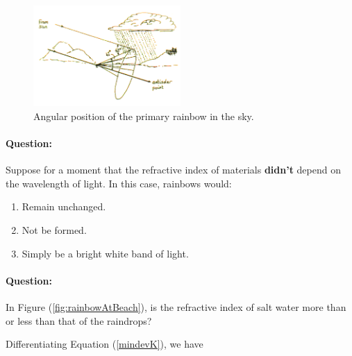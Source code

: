 \begin{refsection}

\begin{figure}[!htb]
    \centering
    \includegraphics[width=0.5\textwidth]{figs/rainarc.png}
    \caption{Angular position of the primary rainbow in the sky.}
    \label{fig:rainbowSky}
\end{figure}


\begin{question}
\paragraph{Question:} Suppose for a moment that the refractive index of materials \textbf{didn't} depend on the wavelength of light. In this case, rainbows would:
\begin{enumerate}
\itemsep0em
    \item Remain unchanged.
    \item Not be formed.
    \item Simply be a bright white band of light.
\end{enumerate}

\paragraph{Question:} In Figure (\ref{fig:rainbowAtBeach}), is the refractive index of salt water more than or less than that of the raindrops?
\end{question}

Differentiating Equation (\ref{mindevK}), we have


\end{refsection}
